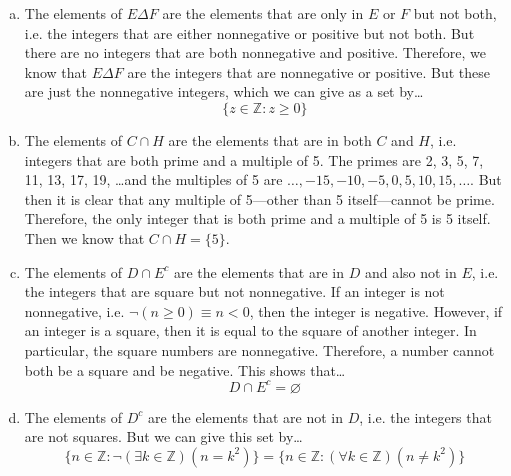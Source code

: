 \documentclass[11pt,letterpaper]{article}
\begin{document}
\begin{enumerate}[(a)]
\item The elements of $E \Delta F$ are the elements that are only in $E$ or $F$ but not both, i.e. the integers that are either nonnegative or positive but not both. But there are no integers that are both nonnegative and positive. Therefore, we know that $E \Delta F$ are the integers that are nonnegative or positive. But these are just the nonnegative integers, which we can give as a set by\dots
	\[
	\{ z \in \mathbb{Z} \colon z \geq 0 \}
	\] \pspace

\item The elements of $C \cap H$ are the elements that are in both $C$ and $H$, i.e. integers that are both prime and a multiple of 5. The primes are 2, 3, 5, 7, 11, 13, 17, 19, \ldots and the multiples of 5 are $\ldots, -15, -10, -5, 0, 5, 10, 15, \ldots$. But then it is clear that any multiple of 5---other than 5 itself---cannot be prime. Therefore, the only integer that is both prime and a multiple of 5 is 5 itself. Then we know that $C \cap H= \{ 5 \}$. \pspace

\item The elements of $D \cap E^c$ are the elements that are in $D$ and also not in $E$, i.e. the integers that are square but not nonnegative. If an integer is not nonnegative, i.e. $\neg (n \geq 0) \equiv n < 0$, then the integer is negative. However, if an integer is a square, then it is equal to the square of another integer. In particular, the square numbers are nonnegative. Therefore, a number cannot both be a square and be negative. This shows that\dots
	\[
	D \cap E^c= \varnothing
	\] \pspace

\item The elements of $D^c$ are the elements that are not in $D$, i.e. the integers that are not squares. But we can give this set by\dots
	\[
	\{ n \in \mathbb{Z} \colon \neg(\exists k \in \mathbb{Z})(n= k^2) \}= \{ n \in \mathbb{Z} \colon (\forall k \in \mathbb{Z})(n \neq k^2) \}
	\]
\end{enumerate}
	
\end{document}
